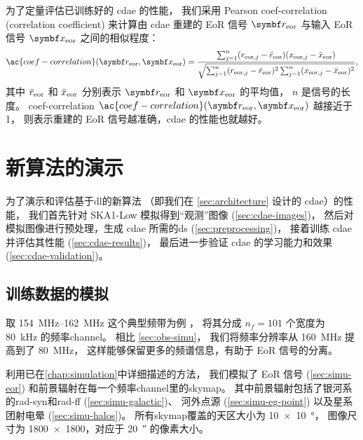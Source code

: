 为了定量评估已训练好的 \ac{cdae} 的性能，
我们采用 Pearson \acl{coef-correlation} (correlation coefficient)
\cite{harker2009,chapman2013}
来计算由 \ac{cdae} 重建的 EoR 信号 $\B{r}_{\R{eor}}$ 与输入 EoR 信号
$\B{x}_{\R{eor}}$ 之间的相似程度：
\begin{equation}
  \label{eq:corrcoef}
  \ac{coef-correlation}(\B{r}_{\R{eor}}, \B{x}_{\R{eor}})
      = \frac{\sum_{j=1}^{n}(r_{\R{eor},j} - \bar{r}_{\R{eor}})
            (x_{\R{eor},j} - \bar{x}_{\R{eor}})}{
          \sqrt{\sum_{j=1}^{n}(r_{\R{eor},j} - \bar{r}_{\R{eor}})^2
            \sum_{j=1}^{n}(x_{\R{eor},j} - \bar{x}_{\R{eor}})^2}
        } ,
\end{equation}
其中
$\bar{r}_{\mathrm{eor}}$ 和 $\bar{x}_{\mathrm{eor}}$ 分别表示
$\B{r}_{\R{eor}}$ 和 $\B{x}_{\R{eor}}$ 的平均值，
$n$ 是信号的长度。
\acl{coef-correlation}
$\ac{coef-correlation}(\B{r}_{\R{eor}}, \B{x}_{\R{eor}})$ 越接近于 1，
则表示重建的 EoR 信号越准确，\ac{cdae} 的性能也就越好。


\section{新算法的演示}
\label{sec:cdae-demo}

为了演示和评估基于\ac{dl}的新算法
（即我们在 \autoref{sec:architecture} 设计的 \ac{cdae}）的性能，
我们首先针对 SKA1-Low 模拟得到\enquote{观测}图像 (\autoref{sec:cdae-images})，
然后对模拟图像进行预处理，生成 \ac{cdae} 所需的\ac{ds} (\autoref{sec:preprocessing})，
接着训练 \ac{cdae} 并评估其性能 (\autoref{sec:cdae-results})，
最后进一步验证 \ac{cdae} 的学习能力和效果 (\autoref{sec:cdae-validation})。

\subsection{训练数据的模拟}
\label{sec:cdae-images}

取 \SIrange{154}{162}{\MHz} 这个典型频带为例 \cite{datta2010}，
将其分成 $n_f = 101$ 个宽度为 \SI{80}{\kHz} 的频率\ac{channel}。
相比 \autoref{sec:obs-simu}，
我们将频率分辨率从 \SI{160}{\MHz} 提高到了 \SI{80}{\MHz}，
这样能够保留更多的频谱信息，有助于 EoR 信号的分离。

利用已在\autoref{chap:simulation}中详细描述的方法，
我们模拟了 EoR 信号 (\autoref{sec:simu-eor})
和前景辐射在每一个频率\ac{channel}里的\ac{skymap}。
其中前景辐射包括了银河系的\ac{rad-syn}和\ac{rad-ff} (\autoref{sec:simu-galactic})、
河外点源 (\autoref{sec:simu-eg-point})
以及星系团射电晕 (\autoref{sec:simu-halos})。
所有\ac{skymap}覆盖的天区大小为 \SI{10 x 10}{\degree}，
图像尺寸为 \num{1800 x 1800}，对应于 \SI{20}{\arcsecond} 的像素大小。

